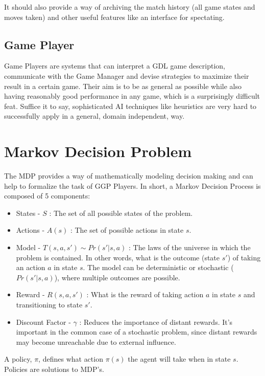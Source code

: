 It should also provide a way of archiving the match history (all game states and moves taken) and other useful features like an interface for spectating.

\subsection{Game Player}
Game Players are systems that can interpret a \gls{GDL} game description, communicate with the Game Manager and devise strategies to maximize their result in a certain game.
Their aim is to be as general as possible while also having reasonably good performance in any game, which is a surprisingly difficult feat. Suffice it to say, sophisticated AI techniques like heuristics are very hard to successfully apply in a general, domain independent, way.

\section{Markov Decision Problem}
The \gls{MDP} provides a way of mathematically modeling decision making and can help to formalize the task of GGP Players.
In short, a Markov Decision Process is composed of 5 components:

\begin{itemize}
\item States - $S$ : The set of all possible states of the problem.

\item Actions - $A(s)$ : The set of possible actions in state $s$.

\item Model - $T(s, a, s') \sim Pr(s' | s, a)$ : The laws of the universe in which the problem is contained. In other words, what is the outcome (state $s'$) of taking an action $a$ in state $s$. The model can be deterministic or stochastic ($Pr(s' | s, a)$), where multiple outcomes are possible.

\item Reward - $R(s, a, s')$ : What is the reward of taking action $a$ in state $s$ and transitioning to state $s'$.

\item Discount Factor - $\gamma$ : Reduces the importance of distant rewards. It's important in the common case of a stochastic problem, since distant rewards may become unreachable due to external influence.
\end{itemize}

A policy, $\pi$, defines what action $\pi(s)$ the agent will take when in state $s$. Policies are solutions to \gls{MDP}'s.

